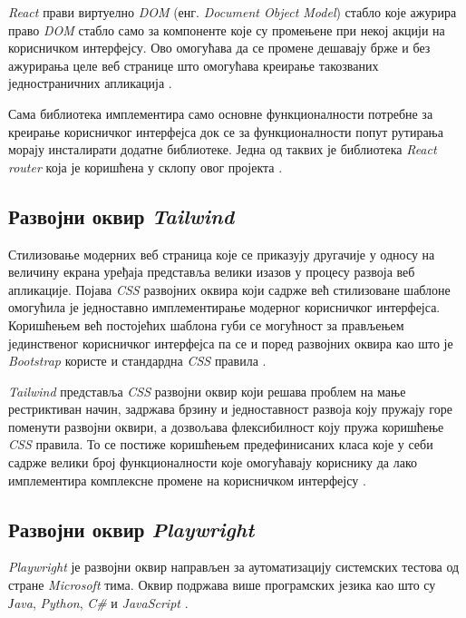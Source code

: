 \documentclass[12pt,oneside]{memoir}
\begin{document}
\textit{React} прави виртуелно \textit{DOM} (енг. \textit{Document Object Model}) стабло које ажурира право \textit{DOM} стабло само за компоненте које су промењене при некој акцији на корисничком интерфејсу. Ово омогућава да се промене дешавају брже и без ажурирања целе веб странице што омогућава креирање такозваних једностраничних апликација \cite{react}. 

Сама библиотека имплементира само основне функционалности потребне за креирање корисничког интерфејса док се за функционалности попут рутирања морају инсталирати додатне библиотеке. Једна од таквих је библиотека \textit{React router} која је коришћена у склопу овог пројекта \cite{reactRouter}.

\subsection{Развојни оквир \textit{Tailwind} }

Стилизовање модерних веб страница које се приказују другачије у односу на величину екрана уређаја представља велики изазов у процесу развоја веб апликације. Појава \textit{CSS} развојних оквира који садрже већ стилизоване шаблоне омогућила је једноставно имплементирање модерног корисничког интерфејса. Коришћењем већ постојећих шаблона губи се могућност за прављењем јединственог корисничког интерфејса па се и поред развојних оквира као што је \textit{Bootstrap} користе и стандардна \textit{CSS} правила \cite{bootstrap}.

\textit{Tailwind} представља \textit{CSS} развојни оквир који решава проблем на мање рестриктиван начин, задржава брзину и једноставност развоја коју пружају горе поменути развојни оквири, а дозвољава флексибилност коју пружа коришћење \textit{CSS} правила. То се постиже коришћењем предефинисаних класа које у себи садрже велики број функционалности које омогућавају кориснику да лако имплементира комплексне промене на корисничком интерфејсу \cite{tailwind}.


\subsection{Развојни оквир \textit{Playwright}}

\textit{Playwright} је развојни оквир направљен за аутоматизацију системских тестова од стране \textit{Microsoft} тима. Оквир подржава више програмских језика као што су \textit{Јava}, \textit{Python}, \textit{C\#}  и \textit{JavaScript} \cite{playwright}.
\end{document}
